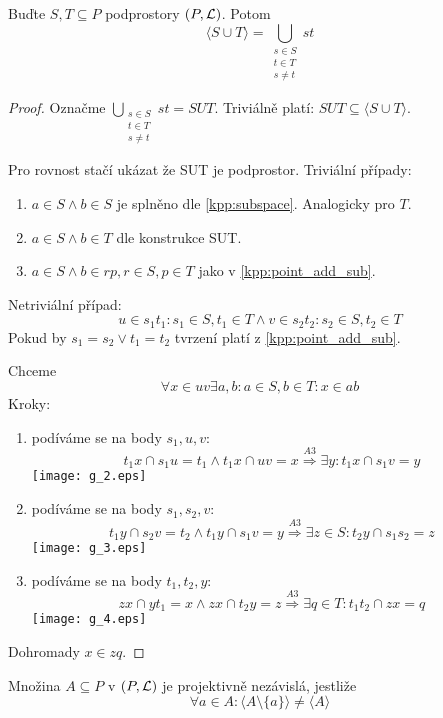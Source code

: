 \begin{lemma}
    Buďte $S,T \subseteq P$ podprostory $(P, \operatorname{\mathcal{L}})$.
    Potom
    \[ \langle S \cup T \rangle = \bigcup_{\substack{ s\in S \\ t\in T \\ s\neq t}} st \]
\end{lemma}
\begin{proof}
	Označme $\bigcup_{\substack{ s\in S \\ t\in T \\ s\neq t}} st = SUT$.
	Triviálně platí: $SUT \subseteq \langle S \cup T \rangle$.

	Pro rovnost stačí ukázat že SUT je podprostor.
	Triviální případy:
	\begin{enumerate}
		\item $a \in S \land b \in S$ je splněno dle \cref{kpp:subspace}.
			Analogicky pro $T$.
		\item $a \in S \land b \in T$ dle konstrukce SUT.
		\item $a \in S \land b \in rp, r \in S, p \in T$ jako v \cref{kpp:point_add_sub}.
	\end{enumerate}

	Netriviální případ:
	\[ u \in s_1t_1: s_1 \in S, t_1 \in T \land v \in s_2t_2: s_2 \in S, t_2 \in T \]
	Pokud by $s_1 = s_2 \lor t_1 = t_2$ tvrzení platí z \cref{kpp:point_add_sub}.

	Chceme
	\[ \forall x \in uv \exists a, b: a \in S, b \in T: x \in ab \]
	Kroky:
	\begin{enumerate}
		\item podíváme se na body $s_1, u, v$:
			\[ t_1x \cap s_1u = t_1 \land t_1x \cap uv = x \stackrel{A3}{\Rightarrow} \exists y: t_1x \cap s_1v = y \]
		\texttt{[image: g\_2.eps]}
	\item podíváme se na body $s_1, s_2, v$:
		\[ t_1y \cap s_2v = t_2 \land t_1y \cap s_1v = y \stackrel{A3}{\Rightarrow} \exists z \in S: t_2y \cap s_1s_2 = z \]
		\texttt{[image: g\_3.eps]}

	\item podíváme se na body $t_1, t_2, y$:
		\[ zx \cap yt_1 = x \land zx \cap t_2y = z \stackrel{A3}{\Rightarrow} \exists q \in T: t_1t_2 \cap zx = q \]
		\texttt{[image: g\_4.eps]}
	\end{enumerate}
	Dohromady $x \in zq$.
\end{proof}

\begin{definition}
    Množina $A\subseteq P$ v $(P,\operatorname{\mathcal{L}})$ je projektivně nezávislá, jestliže
    \[ \forall a\in A: \langle A\setminus \{a\}\rangle\neq\langle A \rangle \]
\end{definition}

